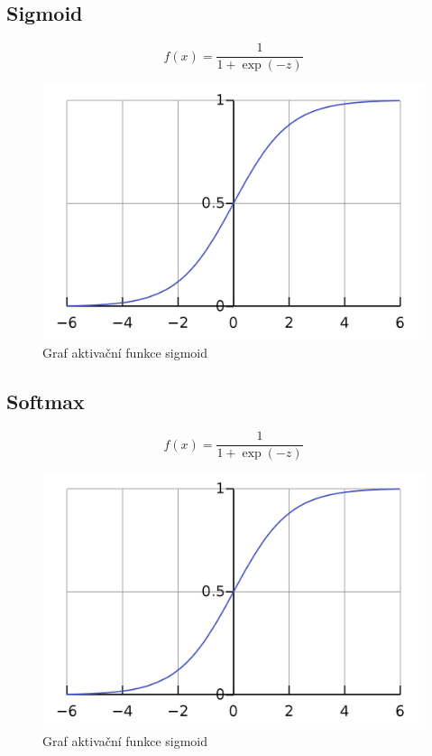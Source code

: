 \subsection{Sigmoid}
\begin{equation}
  f(x) = \frac{1}{1+\exp(-z)}
\end{equation}
\begin{figure}[H]
    \centering
    \includegraphics[scale=0.2]{obrazky-figures/sigmoid.png}
    \caption{\label{fig:sigmoid}Graf aktivační funkce sigmoid}
\end{figure}

\subsection{Softmax}
\begin{equation}
  f(x) = \frac{1}{1+\exp(-z)}
\end{equation}
\begin{figure}[H]
    \centering
    \includegraphics[scale=0.2]{obrazky-figures/sigmoid.png}
    \caption{\label{fig:sigmoid}Graf aktivační funkce sigmoid}
\end{figure}


